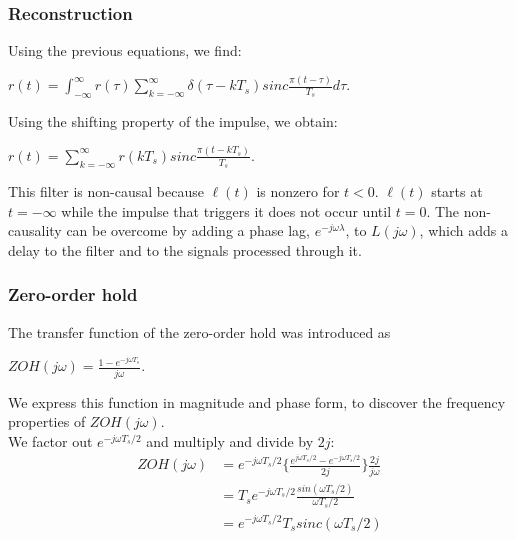 \begin{frame}
	\frametitle{Reconstruction}
	\begin{block}{}
	Using the previous equations, we find:\\
	\begin{center}
	$r(t)=\int_{-\infty}^{\infty} r(\tau)\sum_{k=-\infty}^{\infty} \delta(\tau-kT_s)sinc\frac{\pi(t-\tau)}{T_s}d\tau.$
	\end{center}
	Using the shifting property of the impulse, we obtain:
	\begin{center}
	${r(t)=\sum_{k=-\infty}^{\infty} r(kT_s)sinc\frac{\pi(t-kT_s)}{T_s}}$.
	\end{center}
	\end{block}
	\begin{alertblock}{}
	This filter is non-causal because $\ell(t)$ is nonzero for $t < 0$. $\ell(t)$ starts at $t=-\infty$ while the impulse that triggers it does not occur until $t=0$. The non-causality can be overcome by adding a phase lag, $e^{-j\omega \lambda}$, to $L(j\omega)$, which adds a delay to the filter and to the signals processed through it.
	\end{alertblock}
\end{frame}

\begin{frame}
	\frametitle{Zero-order hold}
	The transfer function of the zero-order hold was introduced as\\
	\vspace{-1ex}
	\begin{center}
		$ZOH(j\omega)=\frac{1-e^{-j\omega T_s}}{j\omega}$.\\
	\end{center}
	\vspace{-1ex}
	We express this function in magnitude and phase form, to discover the frequency properties of $ZOH(j\omega)$.\\
	\medskip
	We factor out $e^{-j\omega T_s/2}$ and multiply and divide by $2j$:\\
	\vspace{-4ex}
	\begin{equation}
	\begin{split}
		ZOH(j\omega) &= e^{-j\omega T_s/2}\Big\{\frac{e^{j\omega T_s/2}-e^{-j\omega T_s/2}}{2j}\Big\} \frac{2j}{j\omega}\\
		& = T_se^{-j\omega T_s/2} \frac{sin(\omega T_s/2)}{\omega T_s/2}\\
		& = e^{-j\omega T_s/2} T_s sinc(\omega T_s/2)
	\end{split} \nonumber
	\end{equation}
	\vspace{-1ex}
\end{frame}

